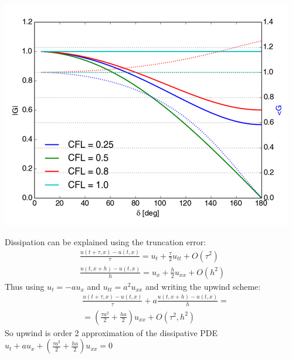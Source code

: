 \documentclass{beamer}
\begin{document}
\begin{frame}
\cite{ebook}
\includegraphics[width=\textwidth]{up_g}
\end{frame}
\begin{frame}
Dissipation can be explained using the truncation error:
\begin{align*}
\frac{u(t+\tau,x) - u(t,x)}{\tau} = u_t + \frac{\tau}{2}u_{tt} + O(\tau^2)
\\
\frac{u(t,x + h) - u(t,x)}{h} = u_x + \frac{h}{2}u_{xx} + O(h^2)
\end{align*}
Thus using $u_t = -au_x$ and $u_{tt} = a^2u_{xx}$ and writing the upwind scheme:
\begin{align*}
& \frac{u(t+\tau,x) - u(t,x)}{\tau} + a\frac{u(t,x + h) - u(t,x)}{h} = \\
& = \left(\frac{\tau a^2}{2}+ \frac{ha}{2}\right) u_{xx} + O(\tau^2,h^2) 
\end{align*}
So upwind is order 2 approximation of the dissipative PDE $u_t +au_x + \left(\frac{\tau a^2}{2}+ \frac{ha}{2}\right) u_{xx} = 0$
\end{frame}
\end{document}
